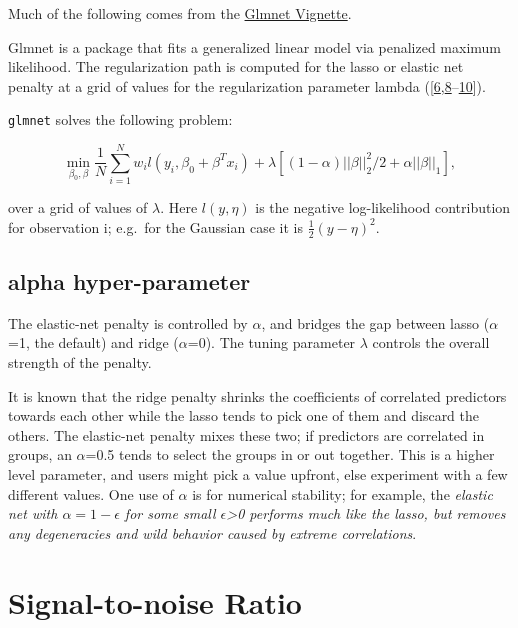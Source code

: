 \documentclass[
]{book}
\begin{document}
Much of the following comes from the
\href{https://web.stanford.edu/~hastie/glmnet/glmnet_alpha.html}{Glmnet Vignette}.

Glmnet is a package that fits a generalized linear model via penalized maximum likelihood.
The regularization path is computed for the lasso or elastic net penalty at a
grid of values for the regularization parameter lambda
({[}\protect\hyperlink{ref-Friedman:2010aa}{6},\protect\hyperlink{ref-Tibshirani:2012aa}{8}--\protect\hyperlink{ref-Simon:2013aa}{10}{]}).

\texttt{glmnet} solves the following problem:

\[\min_{\beta_0,\beta} \frac{1}{N} \sum_{i=1}^{N} w_i l(y_i,\beta_0+\beta^T x_i) + \lambda\left[(1-\alpha)||\beta||_2^2/2 + \alpha ||\beta||_1\right],\]

over a grid of values of \(\lambda\).
Here \(l(y,\eta)\) is the negative log-likelihood contribution for observation i;
e.g.~for the Gaussian case it is \(\frac{1}{2}(y-\eta)^2\).

\hypertarget{alpha-hyper-parameter}{%
\subsection*{\texorpdfstring{\textbf{alpha} hyper-parameter}{alpha hyper-parameter}}\label{alpha-hyper-parameter}}

The elastic-net penalty is controlled by \(\alpha\), and bridges the gap between
lasso (\(\alpha\)=1, the default) and ridge (\(\alpha\)=0).
The tuning parameter \(\lambda\) controls the overall strength of the penalty.

It is known that the ridge penalty shrinks the coefficients of correlated predictors
towards each other while the lasso tends to pick one of them and discard the others.
The elastic-net penalty mixes these two; if predictors are correlated in groups,
an \(\alpha\)=0.5 tends to select the groups in or out together.
This is a higher level parameter, and users might pick a value upfront,
else experiment with a few different values. One use of \(\alpha\) is for numerical stability;
for example, the \emph{elastic net with \(\alpha = 1 - \epsilon\) for some small \(\epsilon\)\textgreater0
performs much like the lasso, but removes any degeneracies and wild behavior caused
by extreme correlations}.

\hypertarget{signal-to-noise}{%
\section{Signal-to-noise Ratio}\label{signal-to-noise}}
\end{document}
